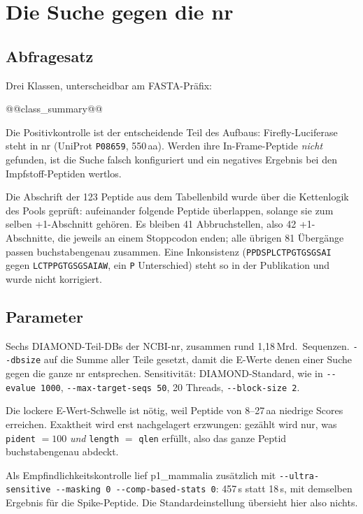 \documentclass[11pt,a4paper]{article}
\begin{document}
\section{Die Suche gegen die nr}

\subsection{Abfragesatz}

Drei Klassen, unterscheidbar am FASTA-Präfix:

@@class_summary@@

Die Positivkontrolle ist der entscheidende Teil des Aufbaus: Firefly-Luciferase
steht in nr (UniProt \texttt{P08659}, 550\,aa). Werden ihre In-Frame-Peptide
\emph{nicht} gefunden, ist die Suche falsch konfiguriert und ein negatives
Ergebnis bei den Impfstoff-Peptiden wertlos.

Die Abschrift der 123 Peptide aus dem Tabellenbild wurde über die Kettenlogik
des Pools geprüft: aufeinander folgende Peptide überlappen, solange sie zum
selben +1-Abschnitt gehören. Es bleiben 41 Abbruchstellen, also 42
+1-Abschnitte, die jeweils an einem Stoppcodon enden; alle übrigen 81 Übergänge
passen buchstabengenau zusammen. Eine Inkonsistenz
(\texttt{PPDSPLCTPGTGSGSAI} gegen \texttt{LCTPPGTGSGSAIAW}, ein \texttt{P}
Unterschied) steht so in der Publikation und wurde nicht korrigiert.

\subsection{Parameter}

Sechs DIAMOND-Teil-DBs der NCBI-nr, zusammen rund 1,18\,Mrd.\ Sequenzen.
\texttt{-{}-dbsize} auf die Summe aller Teile gesetzt, damit die E-Werte denen
einer Suche gegen die ganze nr entsprechen. Sensitivität: DIAMOND-Standard, wie
in \texttt{-{}-evalue 1000},
\texttt{-{}-max-target-seqs 50}, 20 Threads, \texttt{-{}-block-size 2}.

Die lockere E-Wert-Schwelle ist nötig, weil Peptide von 8--27\,aa niedrige
Scores erreichen. Exaktheit wird erst nachgelagert erzwungen: gezählt wird nur,
was \texttt{pident} $= 100$ \emph{und} \texttt{length} $=$ \texttt{qlen}
erfüllt, also das ganze Peptid buchstabengenau abdeckt.

Als Empfindlichkeitskontrolle lief p1\_mammalia zusätzlich mit
\texttt{-{}-ultra-sensitive -{}-masking 0 -{}-comp-based-stats 0}: 457\,s statt
18\,s, mit demselben Ergebnis für die Spike-Peptide. Die Standardeinstellung
übersieht hier also nichts.
\end{document}
